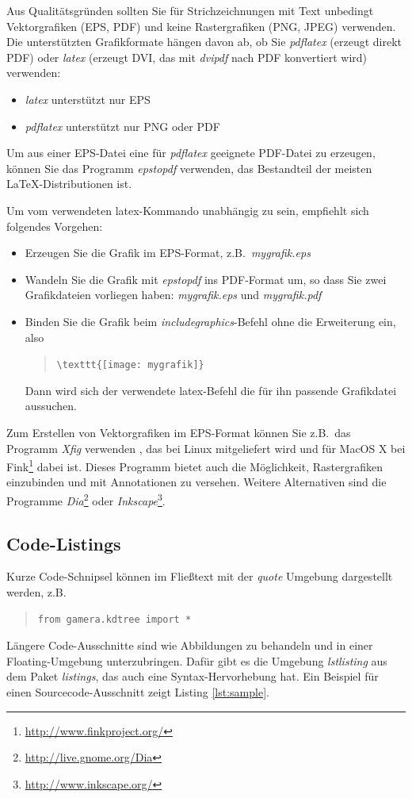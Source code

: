 \documentclass[12pt]{article}
\begin{document}
Aus Qualitätsgründen sollten Sie für Strichzeichnungen mit Text unbedingt
Vektorgrafiken (EPS, PDF) und keine Rastergrafiken (PNG, JPEG) verwenden.
Die unterstützten Grafikformate hängen davon ab, ob Sie {\em pdflatex} 
(erzeugt direkt PDF) oder {\em latex} (erzeugt DVI, das mit {\em dvipdf}
nach PDF konvertiert wird) verwenden:
\begin{itemize}
\item {\em latex} unterstützt nur EPS
\item {\em pdflatex} unterstützt nur PNG oder PDF
\end{itemize}
Um aus einer EPS-Datei eine für {\em pdflatex} geeignete PDF-Datei zu erzeugen,
können Sie das Programm {\em epstopdf} verwenden, das Bestandteil der meisten
\LaTeX-Distributionen ist.

Um vom verwendeten latex-Kommando unabhängig zu sein, empfiehlt sich folgendes
Vorgehen:
\begin{itemize}
\item Erzeugen Sie die Grafik im EPS-Format, z.B.~{\em mygrafik.eps}
\item Wandeln Sie die Grafik mit {\em epstopdf} ins PDF-Format um, so dass
  Sie zwei Grafikdateien vorliegen haben: {\em mygrafik.eps} und 
  {\em mygrafik.pdf}
\item Binden Sie die Grafik beim {\em includegraphics}-Befehl ohne die
  Erweiterung ein, also
  \begin{quote}
    \verb+\texttt{[image: mygrafik]}+
  \end{quote}
  Dann wird sich der verwendete latex-Befehl die für ihn passende
  Grafikdatei aussuchen.
\end{itemize}

Zum Erstellen von Vektorgrafiken im EPS-Format können Sie z.B.~das Programm
{\em Xfig} verwenden \cite{xfig}, das bei Linux mitgeliefert wird und für
MacOS X
bei Fink\footnote{\url{http://www.finkproject.org/}} dabei ist. Dieses
Programm bietet auch die Möglichkeit, Rastergrafiken einzubinden und mit
Annotationen zu versehen. Weitere Alternativen sind die Programme
{\em Dia}\footnote{\url{http://live.gnome.org/Dia}} oder 
{\em Inkscape}\footnote{\url{http://www.inkscape.org/}}.

\subsection{Code-Listings}
Kurze Code-Schnipsel können im Fließtext mit der {\em quote} Umgebung
dargestellt werden, z.B.
\begin{quote}
\begin{verbatim}
from gamera.kdtree import *
\end{verbatim}
\end{quote}
Längere Code-Ausschnitte sind wie Abbildungen zu behandeln und in einer
Floating-Umgebung unterzubringen. Dafür gibt es die Umgebung {\em lstlisting}
aus dem Paket {\em listings}, das auch eine Syntax-Hervorhebung hat.
Ein Beispiel für einen Sourcecode-Ausschnitt zeigt
Listing \ref{lst:sample}.
\end{document}
